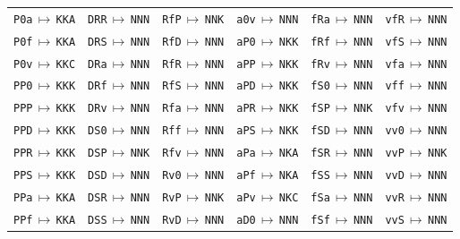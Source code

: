 {\begin{longtable}{@{}llllll@{}}
\texttt{P0a}\,$\mapsto$\,\texttt{KKA} & \texttt{DRR}\,$\mapsto$\,\texttt{NNN} & \texttt{RfP}\,$\mapsto$\,\texttt{NNK} & \texttt{a0v}\,$\mapsto$\,\texttt{NNN} & \texttt{fRa}\,$\mapsto$\,\texttt{NNN} & \texttt{vfR}\,$\mapsto$\,\texttt{NNN} \\
\texttt{P0f}\,$\mapsto$\,\texttt{KKA} & \texttt{DRS}\,$\mapsto$\,\texttt{NNN} & \texttt{RfD}\,$\mapsto$\,\texttt{NNN} & \texttt{aP0}\,$\mapsto$\,\texttt{NKK} & \texttt{fRf}\,$\mapsto$\,\texttt{NNN} & \texttt{vfS}\,$\mapsto$\,\texttt{NNN} \\
\texttt{P0v}\,$\mapsto$\,\texttt{KKC} & \texttt{DRa}\,$\mapsto$\,\texttt{NNN} & \texttt{RfR}\,$\mapsto$\,\texttt{NNN} & \texttt{aPP}\,$\mapsto$\,\texttt{NKK} & \texttt{fRv}\,$\mapsto$\,\texttt{NNN} & \texttt{vfa}\,$\mapsto$\,\texttt{NNN} \\
\texttt{PP0}\,$\mapsto$\,\texttt{KKK} & \texttt{DRf}\,$\mapsto$\,\texttt{NNN} & \texttt{RfS}\,$\mapsto$\,\texttt{NNN} & \texttt{aPD}\,$\mapsto$\,\texttt{NKK} & \texttt{fS0}\,$\mapsto$\,\texttt{NNN} & \texttt{vff}\,$\mapsto$\,\texttt{NNN} \\
\texttt{PPP}\,$\mapsto$\,\texttt{KKK} & \texttt{DRv}\,$\mapsto$\,\texttt{NNN} & \texttt{Rfa}\,$\mapsto$\,\texttt{NNN} & \texttt{aPR}\,$\mapsto$\,\texttt{NKK} & \texttt{fSP}\,$\mapsto$\,\texttt{NNK} & \texttt{vfv}\,$\mapsto$\,\texttt{NNN} \\
\texttt{PPD}\,$\mapsto$\,\texttt{KKK} & \texttt{DS0}\,$\mapsto$\,\texttt{NNN} & \texttt{Rff}\,$\mapsto$\,\texttt{NNN} & \texttt{aPS}\,$\mapsto$\,\texttt{NKK} & \texttt{fSD}\,$\mapsto$\,\texttt{NNN} & \texttt{vv0}\,$\mapsto$\,\texttt{NNN} \\
\texttt{PPR}\,$\mapsto$\,\texttt{KKK} & \texttt{DSP}\,$\mapsto$\,\texttt{NNK} & \texttt{Rfv}\,$\mapsto$\,\texttt{NNN} & \texttt{aPa}\,$\mapsto$\,\texttt{NKA} & \texttt{fSR}\,$\mapsto$\,\texttt{NNN} & \texttt{vvP}\,$\mapsto$\,\texttt{NNK} \\
\texttt{PPS}\,$\mapsto$\,\texttt{KKK} & \texttt{DSD}\,$\mapsto$\,\texttt{NNN} & \texttt{Rv0}\,$\mapsto$\,\texttt{NNN} & \texttt{aPf}\,$\mapsto$\,\texttt{NKA} & \texttt{fSS}\,$\mapsto$\,\texttt{NNN} & \texttt{vvD}\,$\mapsto$\,\texttt{NNN} \\
\texttt{PPa}\,$\mapsto$\,\texttt{KKA} & \texttt{DSR}\,$\mapsto$\,\texttt{NNN} & \texttt{RvP}\,$\mapsto$\,\texttt{NNK} & \texttt{aPv}\,$\mapsto$\,\texttt{NKC} & \texttt{fSa}\,$\mapsto$\,\texttt{NNN} & \texttt{vvR}\,$\mapsto$\,\texttt{NNN} \\
\texttt{PPf}\,$\mapsto$\,\texttt{KKA} & \texttt{DSS}\,$\mapsto$\,\texttt{NNN} & \texttt{RvD}\,$\mapsto$\,\texttt{NNN} & \texttt{aD0}\,$\mapsto$\,\texttt{NNN} & \texttt{fSf}\,$\mapsto$\,\texttt{NNN} & \texttt{vvS}\,$\mapsto$\,\texttt{NNN} \\

\end{longtable}}
